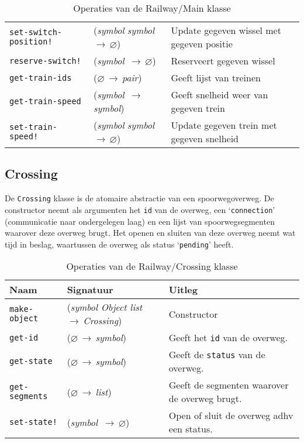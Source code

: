 \documentclass[a4paper, 11pt]{article}
\newcommand{\naar}{\,$\rightarrow$\,}
\renewcommand{\empty}{$\varnothing$}
\newcommand{\<}{\scriptsize\textless\normalsize}
\renewcommand{\>}{\scriptsize\textgreater\normalsize}
\begin{document}
\begin{table}[H]
\begin{center}
{\begin{tabular}{|l l l|}
			\texttt{set-switch-position!} & (\textit{symbol} \textit{symbol} \naar \empty) & Update gegeven wissel met gegeven positie\\
			\texttt{reserve-switch!} & (\textit{symbol} \naar \empty) & Reserveert gegeven wissel\\
			\texttt{get-train-ids} & (\empty \naar \textit{pair}) & Geeft lijst van treinen\\
			\texttt{get-train-speed} & (\textit{symbol} \naar \textit{symbol}) & Geeft snelheid weer van gegeven trein\\
			\texttt{set-train-speed!} & (\textit{symbol} \textit{symbol} \naar \empty) & Update gegeven trein met gegeven snelheid\\
			\hline
		\end{tabular}}
		\caption{Operaties van de Railway/Main klasse}
	\end{center}
\end{table}

\subsection{Crossing} %
De \texttt{Crossing} klasse is de atomaire abstractie van een spoorwegoverweg. De constructor neemt als argumenten het \texttt{id} van de overweg, een \lq\texttt{connection}' (communicatie naar ondergelegen laag) en een lijst van spoorwegsegmenten waarover deze overweg brugt. Het openen en sluiten van deze overweg neemt wat tijd in beslag, waartussen de overweg als status \lq\texttt{pending}' heeft.
\begin{table}[H]
	\begin{center}
		{
		\begin{tabular}{|l l l|}
			\hline
			\textbf{Naam} & \textbf{Signatuur} & \textbf{Uitleg}\\
			\hline
			\texttt{make-object} & (\textit{symbol Object list} \naar \textit{Crossing}) & Constructor\\
			\hline
			\texttt{get-id} & (\empty \naar \textit{symbol}) & Geeft het \texttt{id} van de overweg.\\
			\texttt{get-state} & (\empty \naar \textit{symbol}) & Geeft de \texttt{status} van de overweg.\\
			\texttt{get-segments} & (\empty \naar \textit{list}) & Geeft de segmenten waarover de overweg brugt.\\
			\texttt{set-state!} & (\textit{symbol} \naar \empty) & Open of sluit de overweg adhv een status.\\
			\hline
		\end{tabular}}
		\caption{Operaties van de Railway/Crossing klasse}
	\end{center}
\end{table}
\end{document}
